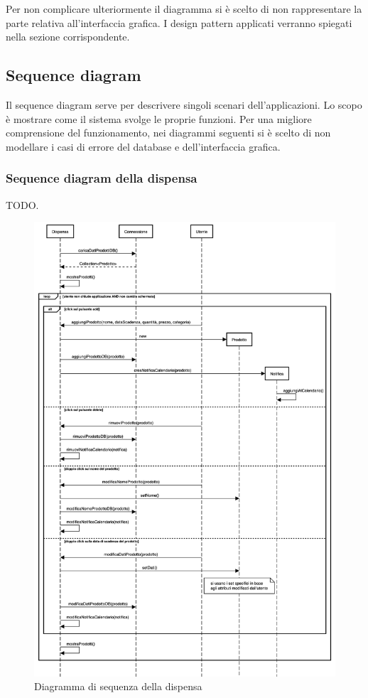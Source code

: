 \documentclass{article}
\begin{document}
Per non complicare ulteriormente il diagramma si è scelto di non rappresentare la parte relativa all'interfaccia grafica. I design pattern applicati verranno spiegati nella sezione corrispondente.

\subsection{Sequence diagram}

Il sequence diagram serve per descrivere singoli scenari dell'applicazioni. Lo scopo è mostrare come il sistema svolge le proprie funzioni. Per una migliore comprensione del funzionamento, nei diagrammi seguenti si è scelto di non modellare i casi di errore del database e dell'interfaccia grafica. 

\subsubsection{Sequence diagram della dispensa}

TODO.

\begin{figure}[H]
    \includegraphics[width=\linewidth]{images/sequence-pantry.png}
    \caption{Diagramma di sequenza della dispensa}
    \label{fig:seqpantry}
\end{figure}
\end{document}
